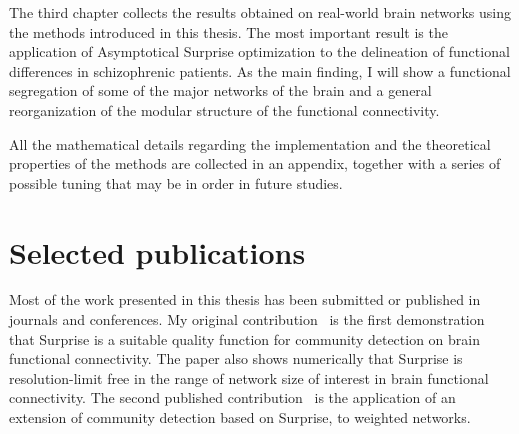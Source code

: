 The third chapter collects the results obtained on real-world brain networks using the methods introduced in this thesis. The most important result is the application of Asymptotical Surprise optimization to the delineation of functional differences in schizophrenic patients. As the main finding, I will show a functional segregation of some of the major networks of the brain and a general reorganization of the modular structure of the functional connectivity.

All the mathematical details regarding the implementation and the theoretical properties of the methods are collected in an appendix, together with a series of possible tuning that may be in order in future studies.

\section*{Selected publications}
Most of the work presented in this thesis has been submitted or published in journals and conferences. My original contribution~\cite{Nicolini2016} is the first demonstration that Surprise is a suitable quality function for community detection on brain functional connectivity.
The paper also shows numerically that Surprise is resolution-limit free in the range of network size of interest in brain functional connectivity.
The second published contribution~\cite{Nicolini2016b} is the application of an extension of community detection based on Surprise, to weighted networks.